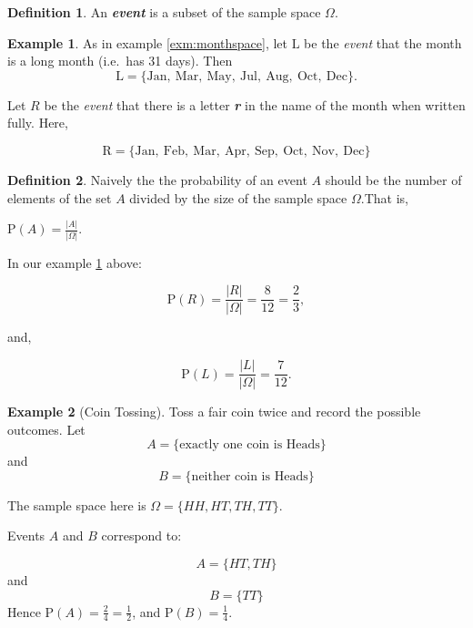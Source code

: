 \documentclass[
]{book}
\theoremstyle{definition}
\newtheorem{definition}{Definition}[chapter]
\theoremstyle{definition}
\newtheorem{example}{Example}[chapter]
\theoremstyle{definition}
\theoremstyle{definition}
\theoremstyle{remark}
\begin{document}
\begin{definition}
\protect\hypertarget{def:event}{}\label{def:event}An \textbf{\emph{event}} is a subset of the sample space \(\Omega\).
\end{definition}

\begin{example}
\protect\hypertarget{exm:landr}{}\label{exm:landr}As in example \ref{exm:monthspace}, let \(\text{L}\) be the \emph{event} that the month is a long month (i.e.~has 31 days). Then
\[\text{L} = \{\text{Jan}, \ \text{Mar}, \ \text{May},  \ \text{Jul}, \ \text{Aug},  \ \text{Oct}, \ \text{Dec} \}.\]

Let \(R\) be the \emph{event} that there is a letter \textbf{\emph{r}} in the name of the month when written fully. Here,

\[\text{R} = \{\text{Jan}, \ \text{Feb}, \ \text{Mar}, \ \text{Apr},  \ \text{Sep}, \ \text{Oct}, \ \text{Nov}, \  \text{Dec} \}\]
\end{example}

\begin{definition}
\protect\hypertarget{def:naiveprob}{}\label{def:naiveprob}Naively the the probability of an event \(A\) should be the number of elements of the set \(A\) divided by the size of the sample space \(\Omega\).That is,

\(\text{P} (A) = \frac{|A|}{|\Omega|}\).
\end{definition}

In our example \ref{exm:landr} above:

\[\text{P}(R) = \frac{|R|}{|\Omega|} = \frac{8}{12} = \frac{2}{3},\]

and,

\[\text{P}(L) = \frac{|L|}{|\Omega|} =\frac{7}{12}.\]

\begin{example}[Coin Tossing]
Toss a fair coin twice and record the possible outcomes. Let
\[A = \{\text{exactly one coin is Heads}\}\]
and
\[B = \{\text{neither coin is Heads}\}\]

The sample space here is \(\Omega = \{HH, HT, TH, TT\}\).

Events \(A\) and \(B\) correspond to:

\[A = \{HT, TH\}\]
and
\[B = \{ TT \}\]
Hence \(\text{P}(A) = \frac{2}{4} = \frac{1}{2}\), and \(\text{P}(B)=\frac{1}{4}\).
\end{example}
\end{document}
